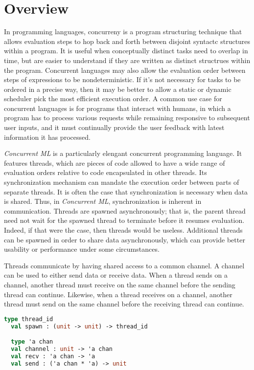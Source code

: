 \documentclass{article}
\begin{document}
\section{Overview}
In programming languages, concurreny is a program structuring technique that allows evaluation
steps to hop back and forth between disjoint syntactc structures within a program. It is useful
when conceptually distinct tasks need to overlap in time, but are easier to understand if they
are written as distinct structrues within the program. Concurrent languages may also allow the
evaluation order between steps of expressions to be nondeterministic. If it's not necessary for
tasks to be ordered in a precise way, then it may be better to allow a static or dynamic
scheduler pick the most efficient execution order. A common use case for concurrent languages
is for programs that interact with humans, in which a program has to process various requests
while remaining responsive to subsequent user inputs, and it must continually provide the user
feedback with latest information it has processed.

\textit{Concurrent ML} is a particularly elengant concurrent programming language.
It features threads, which are pieces of code allowed to have a wide range of
evaluation orders relative to code encapsulated in other threads. Its synchronization
mechanism can mandate the execution order between parts of separate threads. It is often the
case that synchronization is necessary when data is shared. Thus, in \textit{Concurrent ML},
synchronization is inherent in communication. Threads are spawned asynchronously; that is, the
parent thread need not wait for the spawned thread to terminate before it resumes evaluation.
Indeed, if that were the case, then threads would be useless. Additional threads can be spawned
in order to share data asynchronously, which can provide better usability or performance under
some circumstances.

Threads communicate by having shared access to a common channel.  A channel can be used to
either send data or receive data.  When a thread sends on a channel, another thread must
receive on the same channel before the sending thread can continue.  Likewise, when a thread
receives on a channel, another thread must send on the same channel before the receiving thread
can continue.

\begin{lstlisting}[language=ML, escapechar=\%]
  type thread_id
  val spawn : (unit -> unit) -> thread_id

  type 'a chan
  val channel : unit -> 'a chan
  val recv : 'a chan -> 'a
  val send : ('a chan * 'a) -> unit
  \end{lstlisting}
\end{document}
